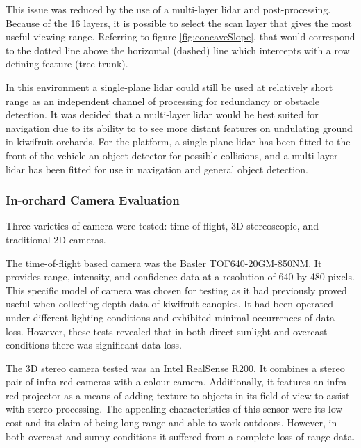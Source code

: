 \documentclass[preprint,authoryear,12pt]{elsarticle}
\begin{document}
        This issue was reduced by the use of a multi-layer lidar and post-processing.
        Because of the 16 layers, it is possible to select the scan layer that gives the most useful viewing range.
        Referring to figure \ref{fig:concaveSlope}, that would correspond to the dotted line above the horizontal (dashed) line which intercepts with a row defining feature (tree trunk).

        In this environment a single-plane lidar could still be used at relatively short range as an independent channel of processing for redundancy or obstacle detection.
        It was decided that a multi-layer lidar would be best suited for navigation due to its ability to to see more distant features on undulating ground in kiwifruit orchards.
        For the platform, a single-plane lidar has been fitted to the front of the vehicle an object detector for possible collisions, and a multi-layer lidar has been fitted for use in navigation and general object detection.


    \subsubsection{In-orchard Camera Evaluation}
        \label{sect:camera_evaluation}

        Three varieties of camera were tested: time-of-flight, 3D stereoscopic, and traditional 2D cameras.

        The time-of-flight based camera was the Basler TOF640-20GM-850NM.
        It provides range, intensity, and confidence data at a resolution of 640 by 480 pixels.
        This specific model of camera was chosen for testing as it had previously proved useful when collecting depth data of kiwifruit canopies.
        It had been operated under different lighting conditions and exhibited minimal occurrences of data loss.
        However, these tests revealed that in both direct sunlight and overcast conditions there was significant data loss.

        The 3D stereo camera tested was an Intel RealSense R200.
        It combines a stereo pair of infra-red cameras with a colour camera.
        Additionally, it features an infra-red projector as a means of adding texture to objects in its field of view to assist with stereo processing.
        The appealing characteristics of this sensor were its low cost and its claim of being long-range and able to work outdoors.
        However, in both overcast and sunny conditions it suffered from a complete loss of range data.
\end{document}
